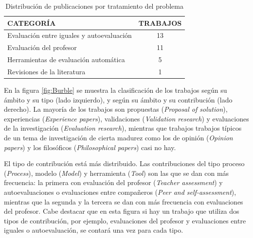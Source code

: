 \begin{table}
  \begin{center}
  \begin{tabular}{| m{10cm} | c |}
    \hline
    CATEGORÍA & TRABAJOS\\
    \hline
    \hline 
    Evaluación entre iguales y autoevaluación & 13\\
    \hline
    Evaluación del profesor & 11\\
    \hline
    Herramientas de evaluación automática & 5\\
    \hline
    Revisiones de la literatura & 1\\
    \hline
  \end{tabular}
\end{center}
\caption{Distribución de publicaciones por tratamiento del problema}
\label{tab:PublicacionesForum}
\end{table} 


En la figura \ref{fig:Burble} se muestra la clasificación de los trabajos según su ámbito y su tipo (lado izquierdo), y según su ámbito y su contribución (lado derecho). La mayoría de los trabajos son propuestas (\emph{Proposal of solution}), experiencias (\emph{Experience papers}), validaciones (\emph{Validation research}) y evaluaciones de la investigación (\emph{Evaluation research}), mientras que trabajos trabajos típicos de un tema de investigación de cierta madurez como los de opinión (\emph{Opinion papers}) y los filosóficos (\emph{Philosophical papers}) casi no hay. %

El tipo de contribución está más distribuido. Las contribuciones del tipo proceso (\emph{Process}), modelo (\emph{Model}) y herramienta (\emph{Tool}) son las que se dan con más frecuencia: la primera con evaluación del profesor (\emph{Teacher assessment}) y autoevaluaciones o evaluaciones entre compañeros (\emph{Peer and self-assessment}), mientras que la segunda y la tercera se dan con más frecuencia con evaluaciones del profesor. Cabe destacar que en esta figura si hay un trabajo que utiliza dos tipos de contribución, por ejemplo, evaluaciones del profesor y evaluaciones entre iguales o autoevaluación, se contará una vez para cada tipo.

